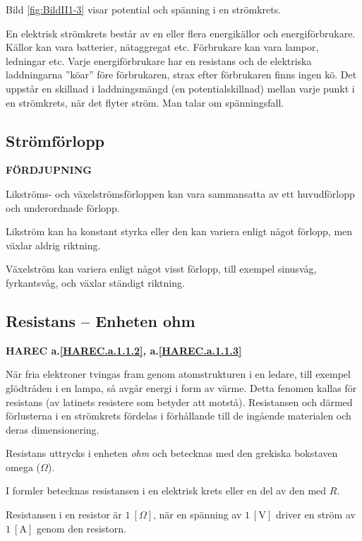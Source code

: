 Bild \ref{fig:BildII1-3} visar potential och spänning i en strömkrets.

En elektrisk strömkrets består av en eller flera energikällor och
energiförbrukare.
Källor kan vara batterier, nätaggregat etc.
Förbrukare kan vara lampor, ledningar etc.
Varje energiförbrukare har en resistans och de elektriska laddningarna ''köar''
före förbrukaren, strax efter förbrukaren finns ingen kö.
Det uppstår en skillnad i laddningsmängd (en potentialskillnad) mellan varje
punkt i en strömkrets, när det flyter ström.
Man talar om spänningsfall.

\subsection{Strömförlopp}
\textbf{FÖRDJUPNING}

Likströms- och växelströmsförloppen kan vara sammansatta av ett huvudförlopp och
underordnade förlopp.

Likström kan ha konstant styrka eller den kan variera enligt något förlopp, men
växlar aldrig riktning.

Växelström kan variera enligt något visst förlopp, till exempel sinusvåg,
fyrkantsvåg, och växlar ständigt riktning.

\subsection{Resistans -- Enheten ohm}
\textbf{HAREC a.\ref{HAREC.a.1.1.2}\label{myHAREC.a.1.1.2c}, a.\ref{HAREC.a.1.1.3}\label{myHAREC.a.1.1.3c}}

När fria elektroner tvingas fram genom atomstrukturen i en ledare, till exempel
glödtråden i en lampa, så avgår energi i form av värme.
Detta fenomen kallas för resistans (av latinets resistere som betyder att
motstå).
Resistansen och därmed förlusterna i en strömkrets fördelas i
förhållande till de ingående materialen och deras dimensionering.

Resistans uttrycks i enheten \emph{ohm} \cite{SIbrochure8} och betecknas med
den grekiska bokstaven omega (\(\Omega\)).

I formler betecknas resistansen i en elektrisk krets eller en del av den med
\(R\).

Resistansen i en resistor är \(1\ [\Omega]\), när en spänning av \(1\ \mathrm{[V]}\)
driver en ström av \(1\ \mathrm{[A]}\) genom den resistorn.

